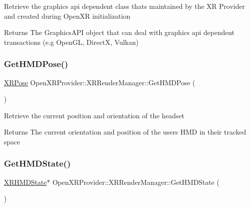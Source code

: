 Retrieve the graphics api dependent class that\textquotesingle{}s maintained by the XR Provider and created during Open\+XR initialization \begin{DoxyReturn}{Returns}
The Graphics\+A\+PI object that can deal with graphics api dependent transactions (e.\+g Open\+GL, DirectX, Vulkan) 
\end{DoxyReturn}
\mbox{\label{class_open_x_r_provider_1_1_x_r_render_manager_a02a943efc18f105316b86a669d20ef2e}} 
\subsubsection{\texorpdfstring{GetHMDPose()}{GetHMDPose()}}
{\footnotesize\ttfamily \mbox{\hyperlink{struct_open_x_r_provider_1_1_x_r_pose}{X\+R\+Pose}} Open\+X\+R\+Provider\+::\+X\+R\+Render\+Manager\+::\+Get\+H\+M\+D\+Pose (\begin{DoxyParamCaption}{ }\end{DoxyParamCaption})}

Retrieve the current position and orientation of the headset \begin{DoxyReturn}{Returns}
The current orientation and position of the user\textquotesingle{}s H\+MD in their tracked space 
\end{DoxyReturn}
\mbox{\label{class_open_x_r_provider_1_1_x_r_render_manager_af6289267e9bf20f6e4d65e4051dd9944}} 
\subsubsection{\texorpdfstring{GetHMDState()}{GetHMDState()}}
{\footnotesize\ttfamily \mbox{\hyperlink{struct_open_x_r_provider_1_1_x_r_h_m_d_state}{X\+R\+H\+M\+D\+State}}$\ast$ Open\+X\+R\+Provider\+::\+X\+R\+Render\+Manager\+::\+Get\+H\+M\+D\+State (\begin{DoxyParamCaption}{ }\end{DoxyParamCaption})\hspace{0.3cm}{\ttfamily [inline]}}

